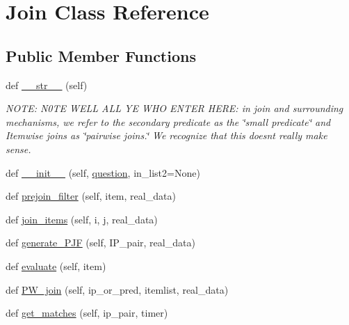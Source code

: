 \hypertarget{classdynamicfilterapp_1_1models_1_1_join}{}\section{Join Class Reference}
\label{classdynamicfilterapp_1_1models_1_1_join}
\subsection*{Public Member Functions}
\begin{DoxyCompactItemize}
\item 
def \mbox{\hyperlink{classdynamicfilterapp_1_1models_1_1_join_a23e8041ce1015febe4fdace3225714f9}{\+\_\+\+\_\+str\+\_\+\+\_\+}} (self)
\begin{DoxyCompactList}\small\item\em N\+O\+TE\+: N0\+TE W\+E\+LL A\+LL YE W\+HO E\+N\+T\+ER H\+E\+RE\+: in join and surrounding mechanisms, we refer to the secondary predicate as the \char`\"{}small predicate\char`\"{} and Itemwise joins as \char`\"{}pairwise joins.\char`\"{} We recognize that this doesn\textquotesingle{}t really make sense. \end{DoxyCompactList}\item 
def \mbox{\hyperlink{classdynamicfilterapp_1_1models_1_1_join_a7564097a16dcabdffeaa80d067a31af1}{\+\_\+\+\_\+init\+\_\+\+\_\+}} (self, \mbox{\hyperlink{classdynamicfilterapp_1_1models_1_1_join_a1a1b6bd27a93f9139a2f44d01f7b3ad1}{question}}, in\+\_\+list2=None)
\item 
def \mbox{\hyperlink{classdynamicfilterapp_1_1models_1_1_join_ad1f0a62df23661b1591a26c02bd59664}{prejoin\+\_\+filter}} (self, item, real\+\_\+data)
\item 
def \mbox{\hyperlink{classdynamicfilterapp_1_1models_1_1_join_af917b6ab7796d7f1e90cb6a45b164120}{join\+\_\+items}} (self, i, j, real\+\_\+data)
\item 
def \mbox{\hyperlink{classdynamicfilterapp_1_1models_1_1_join_a5392742a9380d1854a4857c33423aaf8}{generate\+\_\+\+P\+JF}} (self, I\+P\+\_\+pair, real\+\_\+data)
\item 
def \mbox{\hyperlink{classdynamicfilterapp_1_1models_1_1_join_aced24bb06eb985f2929181e535212ffb}{evaluate}} (self, item)
\item 
def \mbox{\hyperlink{classdynamicfilterapp_1_1models_1_1_join_ade68171b323e0e7d3888f35cfbfa704e}{P\+W\+\_\+join}} (self, ip\+\_\+or\+\_\+pred, itemlist, real\+\_\+data)
\item 
def \mbox{\hyperlink{classdynamicfilterapp_1_1models_1_1_join_a22edc19c031e9b7b51a7c9eab7ba81c1}{get\+\_\+matches}} (self, ip\+\_\+pair, timer)

\end{DoxyCompactItemize}
